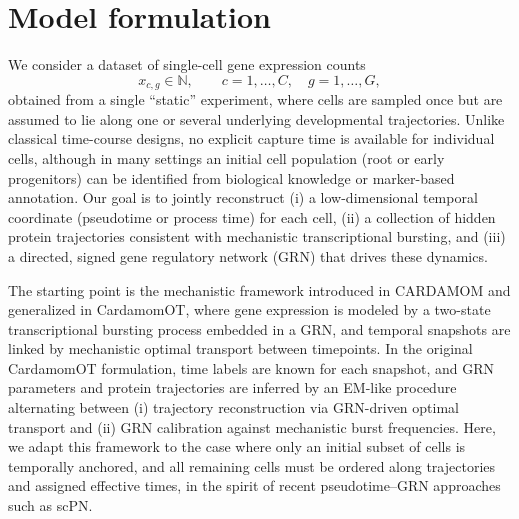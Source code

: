 \documentclass[10pt]{article}
\begin{document}








\section{Model formulation}

We consider a dataset of single-cell gene expression counts
\[
x_{c,g} \in \mathbb{N},
\qquad
c = 1,\dots,C,\quad g = 1,\dots,G,
\]
obtained from a single ``static'' experiment, where cells are sampled once but are assumed to lie along one or several underlying developmental trajectories. Unlike classical time-course designs, no explicit capture time is available for individual cells, although in many settings an initial cell population (root or early progenitors) can be identified from biological knowledge or marker-based annotation. Our goal is to jointly reconstruct (i) a low-dimensional temporal coordinate (pseudotime or process time) for each cell, (ii) a collection of hidden protein trajectories consistent with mechanistic transcriptional bursting, and (iii) a directed, signed gene regulatory network (GRN) that drives these dynamics. 

The starting point is the mechanistic framework introduced in CARDAMOM and generalized in CardamomOT, where gene expression is modeled by a two-state transcriptional bursting process embedded in a GRN, and temporal snapshots are linked by mechanistic optimal transport between timepoints. In the original CardamomOT formulation, time labels are known for each snapshot, and GRN parameters and protein trajectories are inferred by an EM-like procedure alternating between (i) trajectory reconstruction via GRN-driven optimal transport and (ii) GRN calibration against mechanistic burst frequencies.  Here, we adapt this framework to the case where only an initial subset of cells is temporally anchored, and all remaining cells must be ordered along trajectories and assigned effective times, in the spirit of recent pseudotime–GRN approaches such as scPN. \cite{Zhou2025}
\end{document}
